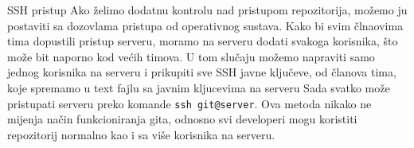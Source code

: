 \documentclass[10pt]{beamer}
\begin{document}
	\begin{frame}{SSH pristup}
		Ako želimo dodatnu kontrolu nad pristupom repozitorija, možemo ju postaviti sa dozovlama pristupa od operativnog sustava. \newline
		Kako bi svim člnaovima tima dopustili pristup serveru, moramo na serveru dodati svakoga korisnika, što može bit naporno kod većih timova.\newline
		U tom slučaju možemo napraviti samo jednog korisnika na serveru i prikupiti sve SSH javne ključeve, od članova tima, koje spremamo u text fajlu sa javnim kljucevima na serveru\newline
		Sada svatko može pristupati serveru preko komande \texttt{ssh git@server}. Ova metoda nikako ne mijenja način funkcioniranja gita, odnosno svi developeri mogu koristiti repozitorij normalno kao i sa više korisnika na serveru.

	\end{frame}
\end{document}
